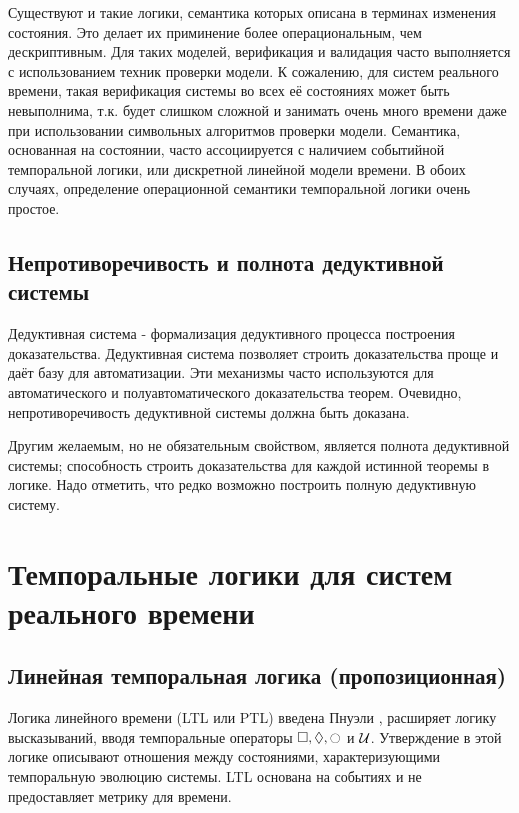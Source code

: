 		  Существуют и такие логики, семантика которых описана в терминах изменения состояния. 
		  Это делает их приминение более операциональным, чем дескриптивным.
		  Для таких моделей, верификация и валидация часто выполняется с использованием техник проверки модели.
		  К сожалению, для систем реального времени, такая верификация системы во всех её состояниях может быть невыполнима, т.к. будет слишком сложной и занимать очень много времени даже при использовании символьных алгоритмов проверки модели.
		  Семантика, основанная на состоянии, часто ассоциируется с наличием событийной темпоральной логики, или дискретной линейной модели времени.
		  В обоих случаях, определение операционной семантики темпоральной логики очень простое.
		  
		  \subsection{Непротиворечивость и полнота дедуктивной системы}
		   Дедуктивная система - формализация дедуктивного процесса построения доказательства.
		   Дедуктивная система позволяет строить доказательства проще и даёт базу для автоматизации.
		   Эти механизмы часто используются для автоматического и полуавтоматического доказательства теорем.
		   Очевидно, непротиворечивость дедуктивной системы должна быть доказана.
		   
		   Другим желаемым, но не обязательным свойством, является полнота дедуктивной системы; способность строить доказательства для каждой истинной теоремы в логике.
		   Надо отметить, что редко возможно построить полную дедуктивную систему.
		   
	\section{Темпоральные логики для систем реального времени}
		\subsection{Линейная темпоральная логика (пропозиционная)}
			Логика линейного времени (LTL или PTL) введена Пнуэли \cite{PnueliOne}  \cite{PnueliTwo} \cite{PnueliThree}, расширяет логику высказываний, вводя темпоральные операторы $ \futureAlways, \futureEventually, \Next $ и $ \mathcal{U} $. 
			Утверждение в этой логике описывают отношения между состояниями, характеризующими темпоральную эволюцию системы. 
			LTL основана на событиях и не предоставляет метрику для времени.
			
